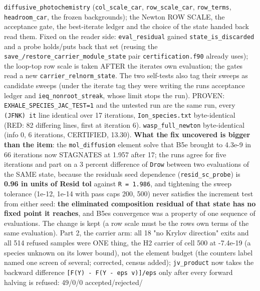 \documentclass[english,a4paper]{my_memo}
\begin{document}
\begin{itemize}
  \texttt{diffusive\_photochemistry} (\texttt{col\_scale\_car}, \texttt{row\_scale\_car}, \texttt{row\_terms},
  \texttt{headroom\_car}, the frozen backgrounds); the Newton ROW SCALE, the
  acceptance gate, the best-iterate ledger and the choice of the state
  handed back read them. Fixed on the reader side: \texttt{eval\_residual} gained
  \texttt{state\_is\_discarded} and a probe holds/puts back that set (reusing the
  \texttt{save\_/restore\_carrier\_module\_state} pair \texttt{certification.f90} already
  uses); the loop-top row scale is taken AFTER the iterate\textquotesingle s own evaluation;
  the gates read a new \texttt{carrier\_relnorm\_state}. The two self-tests also tag
  their sweeps as candidate sweeps (under the iterate tag they were writing
  the run\textquotesingle s acceptance ledger and \texttt{ieq\_nonroot\_streak}, whose limit stops
  the run). PROVEN: \texttt{EXHALE\_SPECIES\_JAC\_TEST=1} and the untested run are the
  same run, every \texttt{(JFNK)\ it} line identical over 17 iterations,
  \texttt{Ion\_species.txt} byte-identical (RED: 82 differing lines, first at
  iteration 6). \texttt{wasp\_full\_newton} byte-identical (info 0, 6 iterations,
  CERTIFIED, 13.30). \textbf{What the fix uncovered is bigger than the item}: the
  \texttt{mol\_diffusion} element solve that B5e brought to 4.3e-9 in 66 iterations
  now STAGNATES at 1.957 after 17; the runs agree for five iterations and
  part on a 3 percent difference of \texttt{Drow} between two evaluations of the
  SAME state, because the residual\textquotesingle s seed dependence (\texttt{resid\_sc\_probe}) is
  \textbf{0.96 in units of Resid tol} against \texttt{\textbar{}\textbar{}R\textbar{}\textbar{}\ =\ 1.986}, and tightening the
  sweep tolerance (1e-12, 1e-14 with pass caps 200, 500) never satisfies
  the increment test from either seed: \textbf{the eliminated composition
  residual of that state has no fixed point it reaches}, and B5e\textquotesingle s
  convergence was a property of one sequence of evaluations. The change is
  kept (a row scale must be the row\textquotesingle s own terms of the same evaluation).
  Part 2, the carrier arm: all 18 "no Krylov direction" exits and all 514
  refused samples were ONE thing, the H2 carrier of cell 500 at -7.4e-19
  (a species unknown on its lower bound), not the element budget (the
  counter\textquotesingle s label named one screen of several; corrected, census added);
  \texttt{jv\_product} now takes the backward difference \texttt{{[}F(Y)\ -\ F(Y\ -\ eps\ v){]}/eps}
  only after every forward halving is refused: 49/0/0 accepted/rejected/

\end{itemize}
\end{document}
